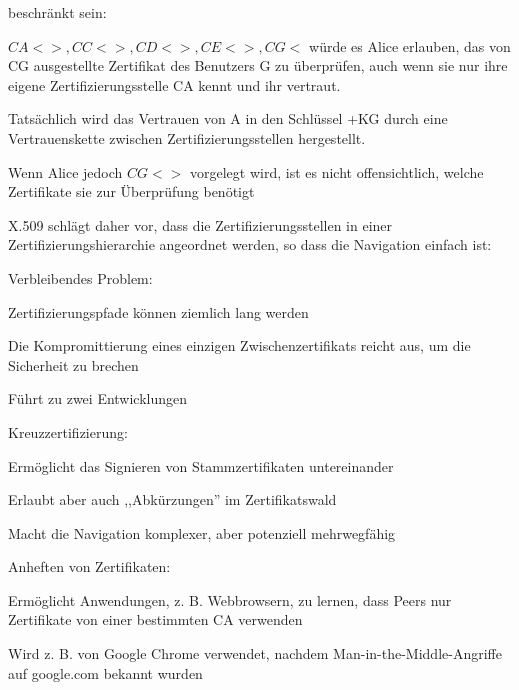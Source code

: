 \documentclass[a4paper]{article}
\begin{document}
\begin{multicols}{3}
\begin{itemize*}
            beschränkt sein:
            \begin{itemize*}
                  \item $CA<>, CC<>, CD<>, CE<>, CG<$ würde es Alice erlauben, das von CG ausgestellte Zertifikat des Benutzers G zu überprüfen, auch wenn sie nur ihre eigene Zertifizierungsstelle CA kennt und ihr vertraut.
                  \item Tatsächlich wird das Vertrauen von A in den Schlüssel +KG durch eine Vertrauenskette zwischen Zertifizierungsstellen hergestellt.
                  \item Wenn Alice jedoch $CG<>$ vorgelegt wird, ist es nicht offensichtlich, welche Zertifikate sie zur Überprüfung benötigt
            \end{itemize*}
            \item X.509 schlägt daher vor, dass die Zertifizierungsstellen in einer
            Zertifizierungshierarchie angeordnet werden, so dass die Navigation
            einfach ist:
            \item Verbleibendes Problem:
            \begin{itemize*}
                  \item Zertifizierungspfade können ziemlich lang werden
                  \item Die Kompromittierung eines einzigen Zwischenzertifikats reicht aus, um die Sicherheit zu brechen
            \end{itemize*}
            \item Führt zu zwei Entwicklungen
            \begin{itemize*}
                  \item Kreuzzertifizierung:
                  \begin{itemize*} \item Ermöglicht das Signieren von Stammzertifikaten untereinander \item Erlaubt aber auch ,,Abkürzungen'' im Zertifikatswald \item Macht die Navigation komplexer, aber potenziell mehrwegfähig \end{itemize*}
                  \item Anheften von Zertifikaten:
                  \begin{itemize*} \item Ermöglicht Anwendungen, z. B. Webbrowsern, zu lernen, dass Peers nur Zertifikate von einer bestimmten CA verwenden \item Wird z. B. von Google Chrome verwendet, nachdem Man-in-the-Middle-Angriffe auf google.com bekannt wurden \end{itemize*}
            \end{itemize*}
      \end{itemize*}



\end{multicols}
\end{document}
